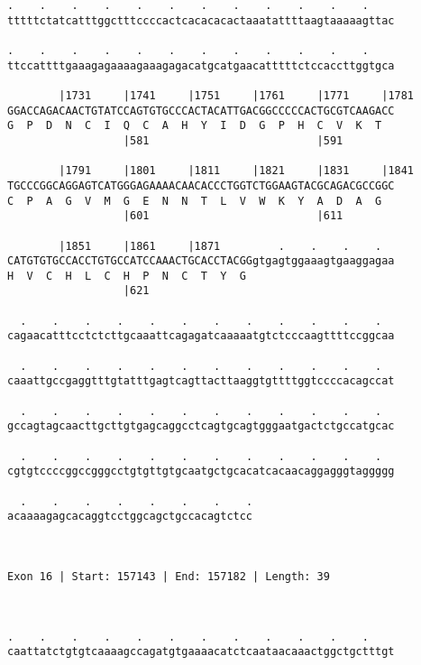 \documentclass{article}
\begin{document}
\begin{Verbatim}
.    .    .    .    .    .    .    .    .    .    .    .    
tttttctatcatttggctttccccactcacacacactaaatattttaagtaaaaagttac
                                                            
.    .    .    .    .    .    .    .    .    .    .    .    
ttccattttgaaagagaaaagaaagagacatgcatgaacatttttctccaccttggtgca
                                                            
        |1731     |1741     |1751     |1761     |1771     |1781
GGACCAGACAACTGTATCCAGTGTGCCCACTACATTGACGGCCCCCACTGCGTCAAGACC
G  P  D  N  C  I  Q  C  A  H  Y  I  D  G  P  H  C  V  K  T  
                  |581                          |591        
  
        |1791     |1801     |1811     |1821     |1831     |1841
TGCCCGGCAGGAGTCATGGGAGAAAACAACACCCTGGTCTGGAAGTACGCAGACGCCGGC
C  P  A  G  V  M  G  E  N  N  T  L  V  W  K  Y  A  D  A  G  
                  |601                          |611        
  
        |1851     |1861     |1871         .    .    .    .  
CATGTGTGCCACCTGTGCCATCCAAACTGCACCTACGGgtgagtggaaagtgaaggagaa
H  V  C  H  L  C  H  P  N  C  T  Y  G                       
                  |621                                      
  
  .    .    .    .    .    .    .    .    .    .    .    .  
cagaacatttcctctcttgcaaattcagagatcaaaaatgtctcccaagttttccggcaa
                                                            
  .    .    .    .    .    .    .    .    .    .    .    .  
caaattgccgaggtttgtatttgagtcagttacttaaggtgttttggtccccacagccat
                                                            
  .    .    .    .    .    .    .    .    .    .    .    .  
gccagtagcaacttgcttgtgagcaggcctcagtgcagtgggaatgactctgccatgcac
                                                            
  .    .    .    .    .    .    .    .    .    .    .    .  
cgtgtccccggccgggcctgtgttgtgcaatgctgcacatcacaacaggagggtaggggg
                                                            
  .    .    .    .    .    .    .    .
acaaaagagcacaggtcctggcagctgccacagtctcc
                                      
                                      
 
Exon 16 | Start: 157143 | End: 157182 | Length: 39



.    .    .    .    .    .    .    .    .    .    .    .    
caattatctgtgtcaaaagccagatgtgaaaacatctcaataacaaactggctgctttgt
                                                            

\end{Verbatim}
\end{document}
